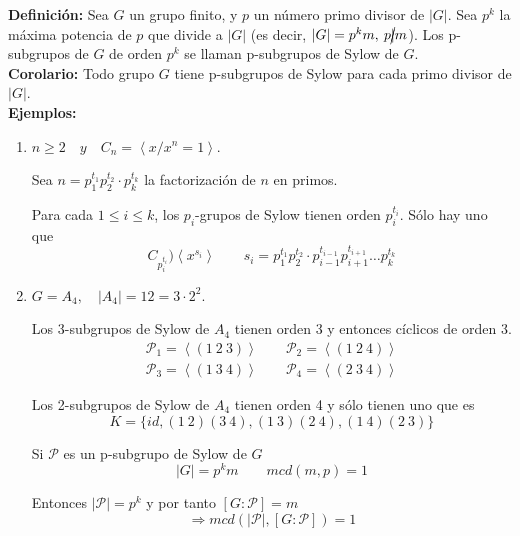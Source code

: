 \documentclass{article}
\begin{document}
\textbf{Definición:} Sea $G$ un grupo finito, y $p$ un número primo divisor de $|G|$. Sea $p^k$ la máxima potencia de $p$ que divide a $|G|$ (es decir, $|G|=p^km,\:p\cancel{\mid}m$). Los p-subgrupos de $G$ de orden $p^k$ se llaman p-subgrupos de Sylow de $G$. \\

\textbf{Corolario:} Todo grupo $G$ tiene p-subgrupos de Sylow para cada primo divisor de $|G|$. \\

\textbf{Ejemplos:} \begin{enumerate}[1)]
\item $n\geq 2\quad y\quad C_n=\left\langle x/x^n=1\right\rangle$.

Sea $n=p_1^{t_1}p_2^{t_2}\cdot p_k^{t_k}$ la factorización de $n$ en primos.

Para cada $1\leq i\leq k$, los $p_i$-grupos de Sylow tienen orden $p_i^{t_i}$. Sólo hay uno que 
\begin{equation*}
C_{p_i^{t_i}})\left\langle x^{s_i}\right\rangle \qquad s_i=p_1^{t_1}p_2^{t_2}\cdot p_{i-1}^{t_{i-1}}p_{i+1}^{t_{i+1}}\ldots p_k^{t_k}
\end{equation*}

\item $G=A_4,\quad |A_4|=12=3\cdot 2^2$.

Los 3-subgrupos de Sylow de $A_4$ tienen orden 3 y entonces cíclicos de orden 3.
\begin{gather*}
\mathcal{P}_1=\left\langle(1\:2\:3)\right\rangle\qquad \mathcal{P}_2=\left\langle(1\:2\:4)\right\rangle \\
\mathcal{P}_3=\left\langle(1\:3\:4)\right\rangle \qquad \mathcal{P}_4=\left\langle(2\:3\:4)\right\rangle
\end{gather*}

Los 2-subgrupos de Sylow de $A_4$ tienen orden 4 y sólo tienen uno que es
\begin{equation*}
K=\{id,(1\:2)(3\:4),(1\:3)(2\:4),(1\:4)(2\:3)\}
\end{equation*}

Si $\mathcal{P}$ es un p-subgrupo de Sylow de $G$
\begin{equation*}
|G|=p^km\qquad mcd(m,p)=1
\end{equation*}

Entonces $|\mathcal{P}|=p^k$ y por tanto $\left[G:\mathcal{P}\right]=m$
\begin{equation*}
\Rightarrow mcd(|\mathcal{P}|,\left[G:\mathcal{P}\right])=1
\end{equation*}
\end{enumerate}
\end{document}
